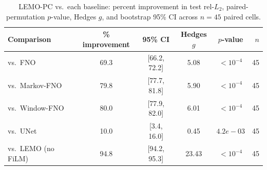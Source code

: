 \begin{table}[h]
\centering
\caption{LEMO-PC vs.\ each baseline: percent improvement in test rel-$L_2$, paired-permutation $p$-value, Hedges $g$, and bootstrap 95\% CI across $n=45$ paired cells.}
\label{tab:headline-per-baseline}
\begin{tabular}{lccccr}
\toprule
Comparison & \% improvement & 95\% CI & Hedges $g$ & $p$-value & $n$ \\
\midrule
vs.\ FNO & 69.3 & [66.2, 72.2] & 5.08 & $<10^{-4}$ & 45 \\
vs.\ Markov-FNO & 79.8 & [77.7, 81.8] & 5.90 & $<10^{-4}$ & 45 \\
vs.\ Window-FNO & 80.0 & [77.9, 82.0] & 6.01 & $<10^{-4}$ & 45 \\
vs.\ UNet & 10.0 & [3.4, 16.0] & 0.45 & $4.2e-03$ & 45 \\
vs.\ LEMO (no FiLM) & 94.8 & [94.2, 95.3] & 23.43 & $<10^{-4}$ & 45 \\
\bottomrule
\end{tabular}
\end{table}